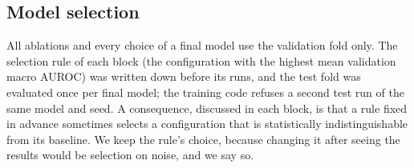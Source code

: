 \subsection{Model selection}

All ablations and every choice of a final model use the validation fold only. The selection rule of
each block (the configuration with the highest mean validation macro AUROC) was written down before
its runs, and the test fold was evaluated once per final model; the training code refuses a second
test run of the same model and seed. A consequence, discussed in each block, is that a rule fixed in
advance sometimes selects a configuration that is statistically indistinguishable from its baseline.
We keep the rule's choice, because changing it after seeing the results would be selection on noise,
and we say so.
